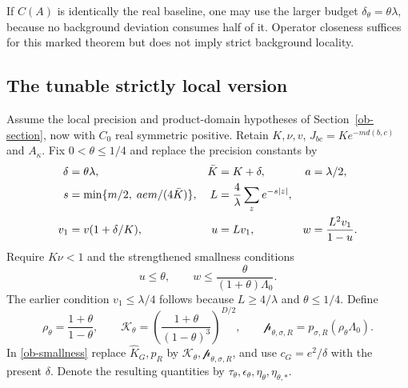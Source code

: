 \documentclass[11pt]{article}
\begin{document}
If $C(A)$ is identically the real baseline, one may use the
larger budget $\delta_\theta=\theta\lambda$, because no
background deviation consumes half of it.
Operator closeness suffices for this marked theorem but does
not imply strict background locality.

\subsection{The tunable strictly local version}

Assume the local precision and product-domain hypotheses of
Section~\ref{ob-section}, now with $C_0$ real symmetric positive.
Retain $K,\nu,v$, $J_{bc}=Ke^{-md(b,c)}$ and $A_\kappa$.
Fix $0<\theta\le1/4$ and replace the precision constants by
\begin{align}
 \delta&=\theta\lambda,& \bar K&=K+\delta,& a&=\lambda/2,
 \notag\\
 s&=\min\{m/2,\;aem/(4\bar K)\},&
 L&=\frac4\lambda\sum_z e^{-s|z|},\notag\\
 v_1&=v(1+\delta/K),&
 u&=Lv_1,& w&=\frac{L^2v_1}{1-u}.                \label{otg-precision-constants}
\end{align}
Require $K\nu<1$ and the strengthened smallness conditions
\begin{equation}\label{otg-precision-small}
 u\le\theta,\qquad
 w\le\frac{\theta}{(1+\theta)\Lambda_0}.
\end{equation}
The earlier condition $v_1\le\lambda/4$ follows because
$L\ge4/\lambda$ and $\theta\le1/4$.
Define
\begin{equation}\label{otg-strict-density-constants}
 \rho_\theta=\frac{1+\theta}{1-\theta},\qquad
 \mathcal K_\theta=
     \left(\frac{1+\theta}{(1-\theta)^3}\right)^{D/2},
 \qquad
 \mathcal p_{\theta,\sigma,R}
        =p_{\sigma,R}(\rho_\theta\Lambda_0).
\end{equation}
In \eqref{ob-smallness} replace
$\widehat K_G,\widehat p_R$ by
$\mathcal K_\theta,\mathcal p_{\theta,\sigma,R}$,
and use $c_G=e^2/\delta$ with the present $\delta$.
Denote the resulting quantities by
$\mathcal\tau_\theta,\mathcal\epsilon_\theta,
\mathcal\eta_\theta,\mathcal\eta_{\theta,*}$.
\end{document}
